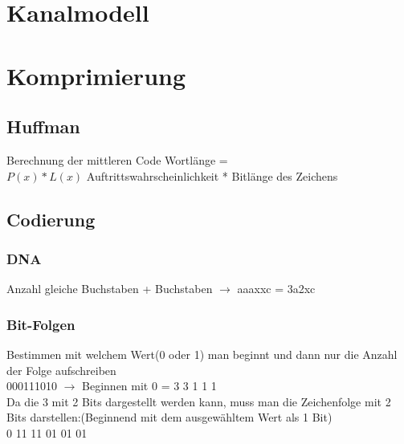 
\section{Kanalmodell}





\section{Komprimierung}


\subsection{Huffman}
Berechnung der mittleren Code Wortlänge =\\ \colorbox{lightlightgrey}{$P(x)*L(x)$} Auftrittswahrscheinlichkeit * Bitlänge des Zeichens


\subsection{Codierung}


\subsubsection{DNA}
Anzahl gleiche Buchstaben + Buchstaben $\rightarrow$ aaaxxc = 3a2xc


\subsubsection{Bit-Folgen}
Bestimmen mit welchem Wert(0 oder 1) man beginnt und dann nur die Anzahl der Folge aufschreiben\\
000111010 $\rightarrow$ Beginnen mit 0 = 3 3 1 1 1\\Da die 3 mit 2 Bits dargestellt werden kann, muss man die Zeichenfolge mit 2 Bits darstellen:(Beginnend mit dem ausgewähltem Wert als 1 Bit)\\
0 11 11 01 01 01









